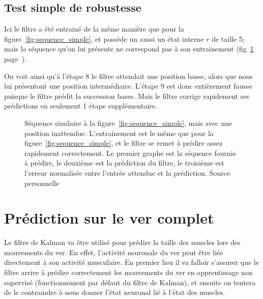 \subsection{Test simple de robustesse} %
\label{sub:Test simple de robustesse}

Ici le filtre a été entrainé de la même manière que pour la
figure~\ref{fig:sequence_simple}, et possède un aussi un état interne $r$ de
taille 5; mais la séquence qu'on lui présente ne correspond pas à son
entrainement (fig~\ref{fig:sequence_simple_erreur}
page~\pageref{fig:sequence_simple_erreur}).

On voit ainsi qu'à l'étape 8 le filtre attendait une position basse, alors que
nous lui présentont une position intermédiaire. L'étape 9 est donc entièrement
fausse puisque le filtre prédit la succession basse. Mais le filtre corrige
rapidement ses prédictions en seulement 1 étape supplémentaire.

\begin{figure}[ht]
   \begin{center}
   \end{center}
   \caption[Prédiction de séquence simple, avec erreur]{Séquence similaire à la
   figure~\ref{fig:sequence_simple}, mais avec une position inattendue.
   L'entrainement est le même que pour la figure~\ref{fig:sequence_simple}, et
   le filtre se remet à prédire assez rapidement correctement. Le premier graphe
   est la séquence fournie à prédire, le deuxième est la prédiction du filtre,
   le troisième est l'erreur normalisée entre l'entrée attendue et la
   prédiction. Source personnelle}
   \label{fig:sequence_simple_erreur}
\end{figure}



\section{Prédiction sur le ver complet} %
\label{sec:Prédiction sur le ver complet}

Le filtre de Kalman va être utilisé pour prédire la taille des muscles lors
des mouvements du ver. En effet, l'activité neuronale du ver peut être liée
directement à son activité musculaire. En premier lieu il va falloir
s'assurer que le filtre arrive à prédire correctement les mouvements du ver en
apprentissage non supervisé (fonctionnement par défaut du filtre de Kalman), et
ensuite on tentera de le contraindre à nous donner l'état neuronal lié à
l'état des muscles.

